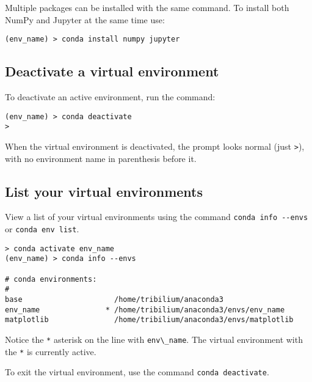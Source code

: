 \documentclass{book}
\newcommand{\passthrough}[1]{#1}
\begin{document}
Multiple packages can be installed with the same command. To install
both NumPy and Jupyter at the same time use:

\begin{lstlisting}
(env_name) > conda install numpy jupyter
\end{lstlisting}
    




    
        \hypertarget{deactivate-a-virtual-environment}{%
\subsection{Deactivate a virtual
environment}\label{deactivate-a-virtual-environment}}

To deactivate an active environment, run the command:

\begin{lstlisting}
(env_name) > conda deactivate
>
\end{lstlisting}

When the virtual environment is deactivated, the prompt looks normal
(just \passthrough{\lstinline!>!}), with no environment name in
parenthesis before it.
    




    
        \hypertarget{list-your-virtual-environments}{%
\subsection{List your virtual
environments}\label{list-your-virtual-environments}}

View a list of your virtual environments using the command
\passthrough{\lstinline!conda info --envs!} or
\passthrough{\lstinline!conda env list!}.

\begin{lstlisting}
> conda activate env_name
(env_name) > conda info --envs

# conda environments:
#
base                     /home/tribilium/anaconda3
env_name               * /home/tribilium/anaconda3/envs/env_name
matplotlib               /home/tribilium/anaconda3/envs/matplotlib
\end{lstlisting}

Notice the \passthrough{\lstinline!*!} asterisk on the line with
\passthrough{\lstinline!env\_name!}. The virtual environment with the
\passthrough{\lstinline!*!} is currently active.

To exit the virtual environment, use the command
\passthrough{\lstinline!conda deactivate!}.
\end{document}
